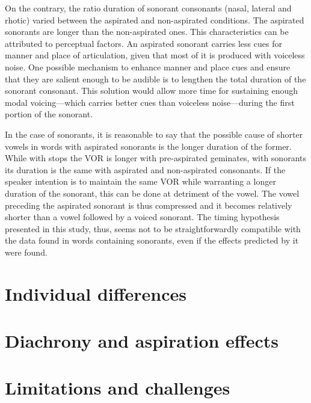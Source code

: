 \documentclass[11pt,a4paper,openany]{memoir}\usepackage[]{graphicx}\usepackage[]{color}
\begin{document}
On the contrary, the ratio duration of sonorant consonants (nasal, lateral and rhotic) varied between the aspirated and non-aspirated conditions.
The aspirated sonorants are longer than the non-aspirated ones.
This characteristics can be attributed to perceptual factors.
An aspirated sonorant carries less cues for manner and place of articulation, given that most of it is produced with voiceless noise.
One possible mechanism to enhance manner and place cues and ensure that they are salient enough to be audible is to lengthen the total duration of the sonorant consonant.
This solution would allow more time for sustaining enough modal voicing---which carries better cues than voiceless noise---during the first portion of the sonorant.

In the case of sonorants, it is reasonable to say that the possible cause of shorter vowels in words with aspirated sonorants is the longer duration of the former.
While with stops the VOR is longer with pre-aspirated geminates, with sonorants its duration is the same with aspirated and non-aspirated consonants.
If the speaker intention is to maintain the same VOR while warranting a longer duration of the sonorant, this can be done at detriment of the vowel.
The vowel preceding the aspirated sonorant is thus compressed and it becomes relatively shorter than a vowel followed by a voiced sonorant.
The timing hypothesis presented in this study, thus, seems not to be straightforwardly compatible with the data found in words containing sonorants, even if the effects predicted by it were found.



\section{Individual differences}


\section{Diachrony and aspiration effects}


\section{Limitations and challenges}
\end{document}
